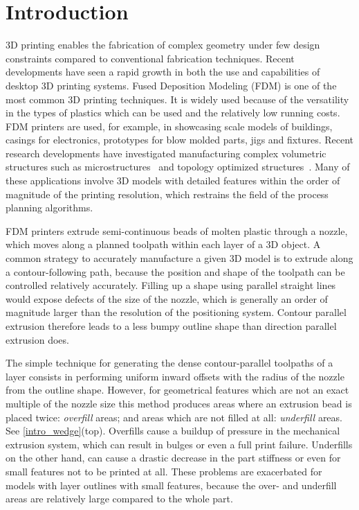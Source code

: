 \section{Introduction}
3D printing enables the fabrication of complex geometry under few design constraints compared to conventional fabrication techniques.
Recent developments have seen a rapid growth in both the use and capabilities of desktop 3D printing systems.
Fused Deposition Modeling (FDM) is one of the most common 3D printing techniques.
It is widely used because of the versatility in the types of plastics which can be used and the relatively low running costs.
FDM printers are used, for example, in showcasing scale models of buildings, casings for electronics, prototypes for blow molded parts, jigs and fixtures.
Recent research developments have investigated manufacturing complex volumetric structures such as microstructures~\cite{bates2018compressive,Al-Ketan2018,Maskery2018} and topology optimized structures~\cite{Zegard2016SMO,Wu2019a,Cheng2019}.
Many of these applications involve 3D models with detailed features within the order of magnitude of the printing resolution, which restrains the field of the process planning algorithms.

FDM printers extrude semi-continuous beads of molten plastic through a nozzle, which moves along a planned toolpath within each layer of a 3D object.
A common strategy to accurately manufacture a given 3D model is to extrude along a contour-following path,
because the position and shape of the toolpath can be controlled relatively accurately.
Filling up a shape using parallel straight lines would expose defects of the size of the nozzle, which is generally an order of magnitude larger than the resolution of the positioning system.
Contour parallel extrusion therefore leads to a less bumpy outline shape than direction parallel extrusion does.


The simple technique for generating the dense contour-parallel toolpaths of a layer consists in performing uniform inward offsets with the radius of the nozzle from the outline shape.
However, for geometrical features which are not an exact multiple of the nozzle size this method produces areas where an extrusion bead is placed twice: \emph{overfill} areas; and areas which are not filled at all: \emph{underfill} areas.
See \cref{intro_wedge}(top).
Overfills cause a buildup of pressure in the mechanical extrusion system, which can result in bulges or even a full print failure.
Underfills on the other hand, can cause a drastic decrease in the part stiffness or even for small features not to be printed at all.
These problems are exacerbated for models with layer outlines with small features, because the over- and underfill areas are relatively large compared to the whole part.

